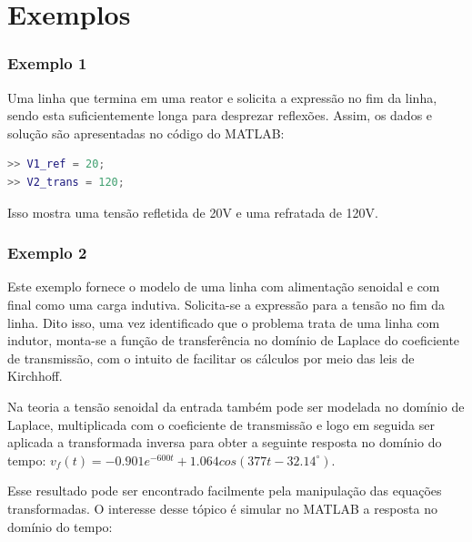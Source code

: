 \section{Exemplos}

\subsubsection*{Exemplo 1}


Uma linha que termina em uma reator e solicita a expressão no fim da linha, sendo esta suficientemente longa para desprezar reflexões. Assim, os dados e solução são apresentadas no código do MATLAB:



\begin{lstlisting}[language=Matlab,style=consolestyle]
>> V1_ref = 20;
>> V2_trans = 120;
\end{lstlisting}

Isso mostra uma tensão refletida de 20V e uma refratada de 120V. 

\subsubsection*{Exemplo 2}

Este exemplo fornece o modelo de uma linha com alimentação senoidal e com final como uma carga indutiva. Solicita-se a expressão para a tensão no fim da linha. Dito isso, uma vez identificado que o problema trata de uma linha com indutor, monta-se a função de transferência no domínio de Laplace do coeficiente de transmissão, com o intuito de facilitar os cálculos por meio das leis de Kirchhoff.

Na teoria a tensão senoidal da entrada também pode ser modelada no domínio de Laplace, multiplicada com o coeficiente de transmissão e logo em seguida ser aplicada a transformada inversa para obter a seguinte resposta no domínio do tempo: $v_f(t) = -0.901e^{-600t}+1.064cos(377t-32.14^{\circ})$. 

Esse resultado pode ser encontrado facilmente pela manipulação das equações transformadas. O interesse desse tópico é simular no MATLAB a resposta no domínio do tempo:



